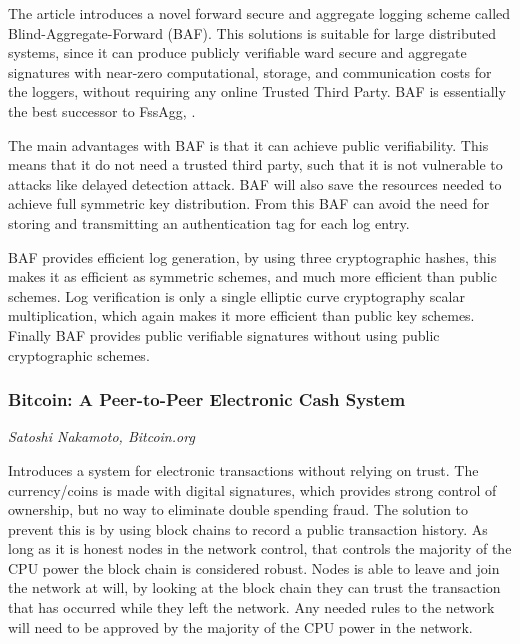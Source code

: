 The article introduces a novel forward secure and aggregate logging
scheme called Blind-Aggregate-Forward (BAF). This solutions is
suitable for large distributed systems, since it can produce publicly
verifiable ward secure and aggregate signatures with near-zero
computational, storage, and communication costs for the loggers,
without requiring any online Trusted Third Party.  BAF is essentially
the best successor to FssAgg, .

The main advantages with BAF is that it can achieve public
verifiability. This means that it do not need a trusted third party,
such that it is not vulnerable to attacks like delayed detection
attack. BAF will also save the resources needed to achieve full
symmetric key distribution. From this BAF can avoid the need for
storing and transmitting an authentication tag for each log entry.

BAF provides efficient log generation, by using three cryptographic
hashes, this makes it as efficient as symmetric schemes, and much more
efficient than public schemes. Log verification is only a single
elliptic curve cryptography scalar multiplication, which again makes
it more efficient than public key schemes. Finally BAF provides public
verifiable signatures without using public cryptographic
schemes.~\cite{baf}

\subsubsection{Bitcoin: A Peer-to-Peer Electronic Cash System}
\vspace{-3mm}
{\footnotesize \it Satoshi Nakamoto, Bitcoin.org}~\cite{nakamoto}

Introduces a system for electronic transactions without relying on
trust. The currency/coins is made with digital signatures, which
provides strong control of ownership, but no way to eliminate double
spending fraud. The solution to prevent this is by using block chains
to record a public transaction history. As long as it is honest nodes
in the network control, that controls the majority of the CPU power
the block chain is considered robust. Nodes is able to leave and join
the network at will, by looking at the block chain they can trust the
transaction that has occurred while they left the network. Any needed
rules to the network will need to be approved by the majority of the
CPU power in the network.~\cite{nakamoto}
